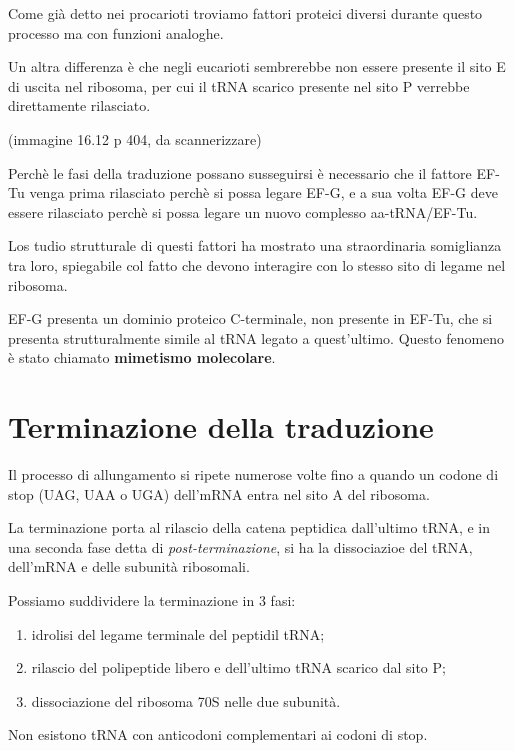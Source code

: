 \documentclass[11pt]{book}
\begin{document}
Come già detto nei procarioti troviamo fattori proteici diversi durante
questo processo ma con funzioni analoghe.

Un altra differenza è che negli eucarioti sembrerebbe non essere
presente il sito E di uscita nel ribosoma, per cui il tRNA scarico
presente nel sito P verrebbe direttamente rilasciato.

(immagine 16.12 p 404, da scannerizzare)

Perchè le fasi della traduzione possano susseguirsi è necessario che il
fattore EF-Tu venga prima rilasciato perchè si possa legare EF-G, e a
sua volta EF-G deve essere rilasciato perchè si possa legare un nuovo
complesso aa-tRNA/EF-Tu.

Los tudio strutturale di questi fattori ha mostrato una straordinaria
somiglianza tra loro, spiegabile col fatto che devono interagire con lo
stesso sito di legame nel ribosoma.

EF-G presenta un dominio proteico C-terminale, non presente in EF-Tu,
che si presenta strutturalmente simile al tRNA legato a quest'ultimo.
Questo fenomeno è stato chiamato \textbf{mimetismo molecolare}.

\section{Terminazione della
traduzione}\label{terminazione-della-traduzione}

Il processo di allungamento si ripete numerose volte fino a quando un
codone di stop (UAG, UAA o UGA) dell'mRNA entra nel sito A del ribosoma.

La terminazione porta al rilascio della catena peptidica dall'ultimo
tRNA, e in una seconda fase detta di \emph{post-terminazione}, si ha la
dissociazioe del tRNA, dell'mRNA e delle subunità ribosomali.

Possiamo suddividere la terminazione in 3 fasi:

\begin{enumerate}
\def\labelenumi{\arabic{enumi}.}
\itemsep1pt\parskip0pt
\item
  idrolisi del legame terminale del peptidil tRNA;
\item
  rilascio del polipeptide libero e dell'ultimo tRNA scarico dal sito P;
\item
  dissociazione del ribosoma 70S nelle due subunità.
\end{enumerate}

Non esistono tRNA con anticodoni complementari ai codoni di stop.
\end{document}
